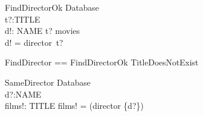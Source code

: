 \begin{schema}{FindDirectorOk}
\Xi Database \\
t?:TITLE \\
d!: NAME
\where
t? \in movies \\
d! = director~t?
\end{schema}

\begin{zed}
FindDirector == FindDirectorOk \lor TitleDoesNotExist
\end{zed}

\begin{schema}{SameDirector}
\Xi Database \\
d?:NAME \\
films!: \power TITLE
\where
films! = \dom(director \rres \{d?\})
\end{schema}
